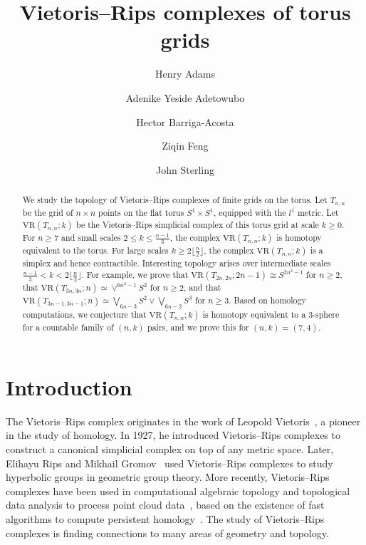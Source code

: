 \documentclass[12pt,a4paper]{amsart}
\title{Vietoris--Rips complexes of torus grids}
\author{Henry Adams}
\author{Adenike Yeside Adetowubo}
\author{Hector Barriga-Acosta}
\author{Ziqin Feng}
\author{John Sterling}
\theoremstyle{definition}
\newcommand{\vr}[2]{\mathrm{VR}(#1;#2)}
\numberwithin{equation}{section}
\begin{document}
\begin{abstract}
We study the topology of Vietoris--Rips complexes of finite grids on the torus.
Let $T_{n,n}$ be the grid of $n\times n$ points on the flat torus $S^1\times S^1$, equipped with the $l^1$ metric.
Let $\vr{T_{n,n}}{k}$ be the Vietoris--Rips simplicial complex of this torus grid at scale $k\ge 0$.
For $n\ge 7$ and small scales $2\le k\le \frac{n-1}{3}$, the complex $\vr{T_{n,n}}{k}$ is homotopy equivalent to the torus.
For large scales $k\ge 2\lfloor\frac{n}{2}\rfloor$, the complex $\vr{T_{n,n}}{k}$ is a simplex and hence contractible.
Interesting topology arises over intermediate scales $\frac{n-1}{3}<k<2\lfloor\frac{n}{2}\rfloor$.
For example, we prove that $\vr{T_{2n,2n}}{2n-1}\cong S^{2n^2-1}$ for $n\ge 2$, that $\vr{T_{3n,3n}}{n}\simeq\vee^{6n^2-1}S^2$ for $n\ge 2$, and that $\vr{T_{3n-1,3n-1}}{n}\simeq \bigvee_{6n-3} S^2\vee \bigvee_{6n-2}S^3$ for $n\geq 3$.
Based on homology computations, we conjecture that $\vr{T_{n,n}}{k}$ is homotopy equivalent to a 3-sphere for a countable family of $(n,k)$ pairs, and we prove this for $(n,k)=(7,4)$.
\end{abstract}

\maketitle




\section{Introduction}
\label{sec:intro}

The Vietoris--Rips complex originates in the work of Leopold Vietoris~\cite{Vietoris27}, a pioneer in the study of homology.
In 1927, he introduced Vietoris--Rips complexes to construct a canonical simplicial complex on top of any metric space.
Later, Elihayu Rips and Mikhail Gromov~\cite{Gromov1987} used Vietoris--Rips complexes to study hyperbolic groups in geometric group theory.
More recently, Vietoris--Rips complexes have been used in computational algebraic topology and topological data analysis to process point cloud data~\cite{Carlsson2009,EdelsbrunnerHarer,edelsbrunner2013persistent,dey2022computational,zomorodian2009computational}, based on the existence of fast algorithms to compute persistent homology~\cite{bauer2021ripser,zomorodian2010fast,zomorodian2005computing}.
The study of Vietoris--Rips complexes is finding connections to many areas of geometry and topology.
\end{document}

